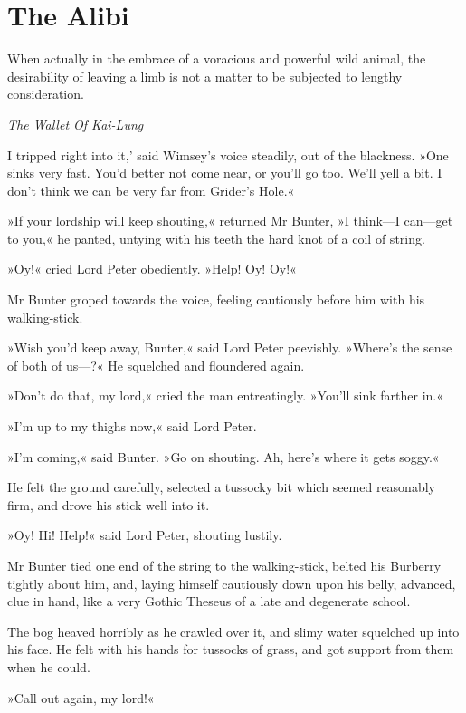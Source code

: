 
\chapter{The Alibi}

\epigraph{When actually in the embrace of a voracious and powerful wild animal, the desirability of leaving a limb is not a matter to be subjected to
lengthy consideration.}{\textit{The Wallet Of Kai-Lung}}

\lettrine[lines=4,ante=`]{I}{} tripped right into it,' said Wimsey's voice steadily, out of the blackness. »One sinks very fast. You'd better not come near, or you'll go too. We'll yell a bit. I don't think we can be very far from Grider's Hole.«

»If your lordship will keep shouting,« returned Mr Bunter, »I think\allowbreak---\allowbreak I can\allowbreak---\allowbreak get to you,« he panted, untying with his teeth the hard knot of a coil of string.

»Oy!« cried Lord Peter obediently. »Help! Oy! Oy!«

Mr Bunter groped towards the voice, feeling cautiously before him with his walking-stick.

»Wish you'd keep away, Bunter,« said Lord Peter peevishly. »Where's the sense of both of us---?« He squelched and floundered again.

»Don't do that, my lord,« cried the man entreatingly. »You'll sink farther in.«

»I'm up to my thighs now,« said Lord Peter.

»I'm coming,« said Bunter. »Go on shouting. Ah, here's where it gets soggy.«

He felt the ground carefully, selected a tussocky bit which seemed reasonably firm, and drove his stick well into it.

»Oy! Hi! Help!« said Lord Peter, shouting lustily.

Mr Bunter tied one end of the string to the walking-stick, belted his Burberry tightly about him, and, laying himself cautiously down upon his belly, advanced, clue in hand, like a very Gothic Theseus of a late and degenerate school.

The bog heaved horribly as he crawled over it, and slimy water squelched up into his face. He felt with his hands for tussocks of grass, and got support from them when he could.

»Call out again, my lord!«

